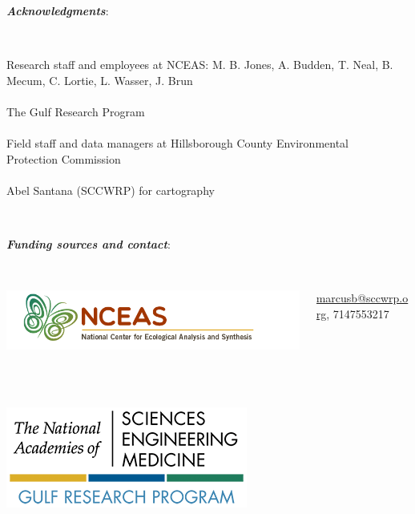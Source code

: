 \documentclass[serif]{beamer}\usepackage[]{graphicx}\usepackage[]{color}
\newcommand{\emtxt}[1]{\textbf{\textit{{\color{mypal4} #1}}}}
\begin{document}
\begin{frame}
\emtxt{Acknowledgments}:\\~\\
\begin{columns}
\begin{column}{0.8\textwidth}
{\footnotesize
Research staff and employees at NCEAS: M. B. Jones, A. Budden, T. Neal, B. Mecum, C. Lortie, L. Wasser, J. Brun  \\~\\
The Gulf Research Program \\~\\
Field staff and data managers at Hillsborough County Environmental Protection Commission\\~\\
Abel Santana (SCCWRP) for cartography\\~\\}
\end{column}
\begin{column}{0.2\textwidth}
\end{column}
\end{columns}
\vfill
\emtxt{Funding sources and contact}:\\~\\
\begin{columns}
\begin{column}{0.5\textwidth}
\centerline{\includegraphics[width=\linewidth]{fig/nceas_full.png}}\\~\\
\vspace{0.15in}
\centerline{\includegraphics[width=0.6\linewidth]{fig/grplogo.png}}
\end{column}
\begin{column}{0.5\textwidth}
\scriptsize
\href{mailto:marcusb@sccwrp.org}{marcusb@sccwrp.org}, 7147553217\\~\\

\end{column}
\end{columns}
\end{frame}
\end{document}
